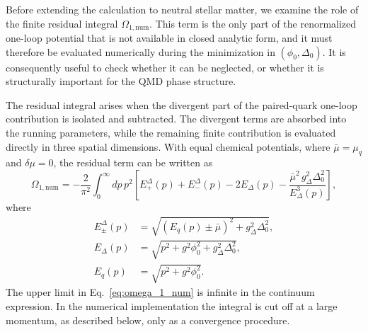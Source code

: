 Before extending the calculation to neutral stellar matter, we examine
the role of the finite residual integral \(\Omega_{1,\mathrm{num}}\).
This term is the only part of the renormalized one-loop potential that
is not available in closed analytic form, and it must therefore be
evaluated numerically during the minimization in
\((\phi_0,\Delta_0)\). It is consequently useful to check whether it can
be neglected, or whether it is structurally important for the QMD phase
structure.

The residual integral arises when the divergent part of the paired-quark
one-loop contribution is isolated and subtracted. The divergent terms are
absorbed into the running parameters, while the remaining finite
contribution is evaluated directly in three spatial dimensions. With
equal chemical potentials, where \(\bar{\mu}=\mu_q\) and
\(\delta\mu=0\), the residual term can be written as
\begin{equation}
\Omega_{1,\mathrm{num}}
=
-\frac{2}{\pi^2}\int_0^{\infty}
dp\,p^2
\left[
E^\Delta_+(p)+E^\Delta_-(p)
- 2 E_\Delta(p)
- \frac{\bar{\mu}^2\, g_\Delta^2 \Delta_0^2}{E_\Delta^3(p)}
\right],
\label{eq:omega_1_num}
\end{equation}
where
\begin{align}
E^\Delta_\pm(p)
&=
\sqrt{\left(E_q(p)\pm\bar{\mu}\right)^2
+g_\Delta^2\Delta_0^2}, \\
E_\Delta(p)
&=
\sqrt{p^2+g^2\phi_0^2+g_\Delta^2\Delta_0^2}, \\
E_q(p)
&=
\sqrt{p^2+g^2\phi_0^2}.
\end{align}
The upper limit in Eq.~\eqref{eq:omega_1_num} is infinite in the
continuum expression. In the numerical implementation the integral is
cut off at a large momentum, as described below, only as a convergence
procedure.

